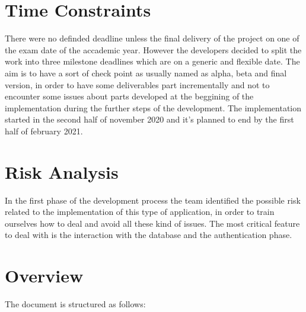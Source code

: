 	\section{Time Constraints}
		There were no definded deadline unless the final delivery of the project on one of the exam date of the accademic year.
		However the developers decided to split the work into three milestone deadlines which are on a generic and flexible date. 
		The aim is to have a sort of check point as usually named as alpha, beta and final version, in order to have some deliverables part incrementally and not to encounter some issues about parts developed at the beggining of the implementation during the further steps of the development.
		The implementation started in the second half of november 2020 and it's planned to end by the first half of february 2021.


	\section{Risk Analysis}
		In the first phase of the development process the team identified the possible risk related to the implementation of this type of application, in order to train ourselves how to deal and avoid all these kind of issues.
		The most critical feature to deal with is the interaction with the database and the authentication phase.


	\section{Overview}
		The document is structured as follows:

